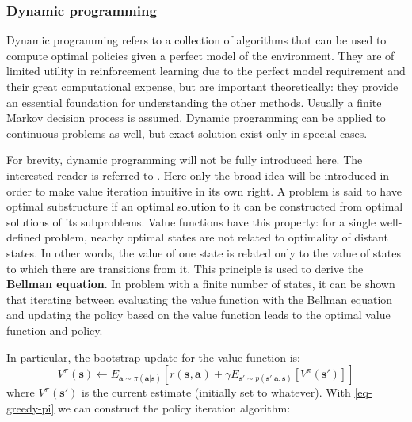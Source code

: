 \subsubsection{Dynamic programming}
Dynamic programming refers to a collection of algorithms that can be used
to compute optimal policies given a perfect model of the environment.
They are of limited utility in reinforcement learning due to the perfect model requirement 
and their great computational expense, but are important theoretically:
they provide an essential foundation for understanding the other methods.
Usually a finite Markov decision process is assumed. Dynamic programming can be applied to continuous 
problems as well, but exact solution exist only in special cases.

For brevity, dynamic programming will not be fully introduced here.
The interested reader is referred to \cite{suttonrlbook}.
Here only the broad idea will be introduced in order to make value iteration intuitive in its own right.
A problem is said to have optimal substructure if an optimal solution to it can be constructed from
optimal solutions of its subproblems.
Value functions have this property: for a single well-defined problem,
nearby optimal states are not related to optimality of distant states.
In other words, the value of one state is related only to the value of states to which there are transitions from it.
This principle is used to derive the \textbf{Bellman equation}.
In problem with a finite number of states, it can be shown that iterating between evaluating the value function
with the Bellman equation
and updating the policy based on the value function leads to the optimal value function and policy.

In particular, the bootstrap update for the value function is:
\begin{equation}
		\label{eq-bellman-value-update}
V^\pi(\bm{s}) \leftarrow E_{\bm{a} \sim \pi(\bm{a}|\bm{s})} \left[ r(\bm{s}_{}, \bm{a}_{}) + \gamma E_{\bm{s}' \sim p(\bm{s}' |\bm{a},\bm{s}  )} [V^\pi(\bm{s}') ] \right] 
\end{equation}
where $   V^\pi(\bm{s}') $ is the current estimate (initially set to whatever).
With \ref{eq-greedy-pi} we can construct the policy iteration algorithm:


